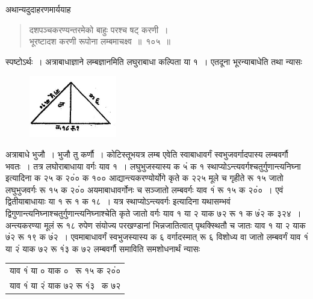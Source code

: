 \documentclass[11pt, openany]{book}
\begin{document}
\vspace{-2mm}
 अथान्यदुदाहरणमार्ययाह\textendash
 \begin{quote}
     \eg
    दशपञ्चकरण्यन्तरमेको बाहुः परश्च षट् करणी~। \\
 भूरष्टादश करणी रूपोना लम्बमाचक्ष्व~॥~१०५~॥~ 
 \end{quote}

 स्पष्टोऽर्थः~। अत्राबाधाज्ञाने लम्बज्ञानमिति लघुराबाधा कल्पिता या १~। एतदूना भूरन्याबाधेति तथा न्यासः 
\begin{figure}[h!]
    \centering
    \includegraphics[scale=0.8]{graphics/Capture30.png}
\end{figure}
\newpage

\noindent अत्राबाधे भुजौ~। भुजौ तु कर्णौ~। कोटिस्तूभयत्र लम्ब एवेति
स्वाबाधावर्गं स्वभुजवर्गादपास्य लम्बवर्गौ भवतः~। तत्र लघोराबाधाया वर्गः याव १~। लघुभुजस्यास्य क
५ं क १ 
स्थाप्योऽन्त्यवर्गश्चतुर्गुणान्त्यनिघ्ना इत्यादिना क २५ क २०ं० क १००
आद्यान्त्यकरण्योर्योगे कृते क २२५ मूले च गृहीते रू १५ जातो लघुभुजवर्गः रू १५ क २०ं०
अयमाबाधावर्गोनः च सञ्जातो लम्बवर्गः याव १ं रू १५ क २०ं०~। एवं
द्वितीयाबाधायाः 
या १ रू १ क १८~। यत्र {\qt स्थाप्योऽन्त्यवर्गः} इत्यादिना यथासम्भवं
द्विगुणान्त्यनिघ्नाश्चतुर्गुणान्त्यनिघ्नाश्चेति कृते जातो वर्गः याव १ या २ याक ७२ रू
१ क ७ं२ 
क ३२४~। अन्त्यकरण्या मूलं रू १८ रुपेण संयोज्य परखण्डानां
भिन्नजातित्वात् 
पृथक्स्थितौ च जातः याव १ या २ याक ७ं२ रू १९ क ७ं२~। एवमाबाधावर्गं 
स्वभुजस्यास्य क ६ वर्गादस्मात् रू ६ विशोध्य वा जातो लम्बवर्गं याव १ं
या २ं याक 
७२ रू १ं३ क ७२  लम्बवर्गौ समाविति समशोधनार्थं न्यासः 

\begin{table}[h!]
    \centering\s
    \begin{tabular}{l}
        याव १ं या ० याक ० ~रू १५ क २०ं० \\
	    याव १ं या २ं याक ७२ रू १ं३ ~क ७२ 
    \end{tabular}
\end{table}
\vspace{-2mm}
\end{document}
